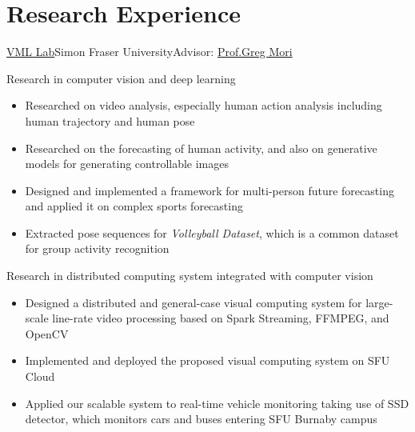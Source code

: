 \documentclass[12pt,a4paper,sans]{moderncv}   %
\begin{document}
\section{Research Experience}
{\newline \href{http://vml.cs.sfu.ca/}{VML Lab}}{Simon Fraser University}{Advisor: \href{http://www.cs.sfu.ca/~mori/}{Prof.Greg Mori}}
{Research in computer vision and deep learning%
\begin{itemize}%
\item Researched on video analysis, especially human action analysis including human trajectory and human pose
\item Researched on the forecasting of human activity, and also on generative models for generating controllable images
\item Designed and implemented a framework for multi-person future forecasting and applied it on complex sports forecasting
\item Extracted pose sequences for \textit{Volleyball Dataset}, which is a common dataset for group activity recognition
\end{itemize}}

{Research in distributed computing system integrated with computer vision%
\begin{itemize}%
\item Designed a distributed and general-case visual computing system for large-scale line-rate video processing based on Spark Streaming, FFMPEG, and OpenCV
\item Implemented and deployed the proposed visual computing system on SFU Cloud
\item Applied our scalable system to real-time vehicle monitoring taking use of SSD detector, which monitors cars and buses entering SFU Burnaby campus 
\end{itemize}
}
\end{document}
